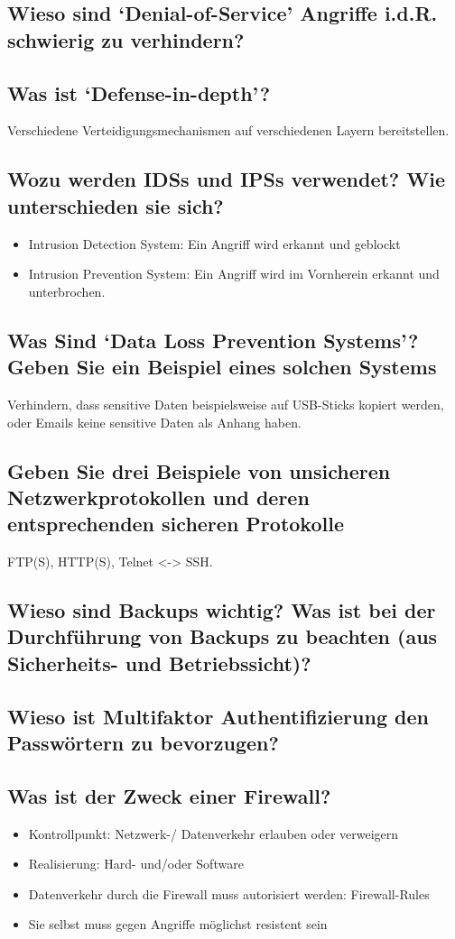 \subsection*{Wieso sind ‘Denial-of-Service’ Angriffe i.d.R. schwierig zu verhindern?}
\subsection*{Was ist ‘Defense-in-depth’?}
Verschiedene Verteidigungsmechanismen auf verschiedenen Layern bereitstellen.

\subsection*{Wozu werden IDSs und IPSs verwendet? Wie unterschieden sie sich?}
\begin{itemize}
    \item Intrusion Detection System: Ein Angriff wird erkannt und geblockt
    \item Intrusion Prevention System: Ein Angriff wird im Vornherein erkannt und unterbrochen.
\end{itemize}
\subsection*{Was Sind ‘Data Loss Prevention Systems’? Geben Sie ein Beispiel eines solchen Systems}
Verhindern, dass sensitive Daten beispielsweise auf USB-Sticks kopiert werden, oder Emails keine sensitive Daten als Anhang haben.
\subsection*{Geben Sie drei Beispiele von unsicheren Netzwerkprotokollen und deren entsprechenden sicheren Protokolle}
FTP(S), HTTP(S), Telnet <-> SSH.

\subsection*{Wieso sind Backups wichtig? Was ist bei der Durchführung von Backups zu beachten (aus Sicherheits- und Betriebssicht)?}
\subsection*{Wieso ist Multifaktor Authentifizierung den Passwörtern zu bevorzugen?}
\subsection*{Was ist der Zweck einer Firewall?}
\begin{itemize}
    \item Kontrollpunkt: Netzwerk-/ Datenverkehr erlauben oder verweigern
    \item Realisierung: Hard- und/oder Software
    \item Datenverkehr durch die Firewall muss autorisiert werden: Firewall-Rules
    \item Sie selbst muss gegen Angriffe möglichst resistent sein
\end{itemize}

